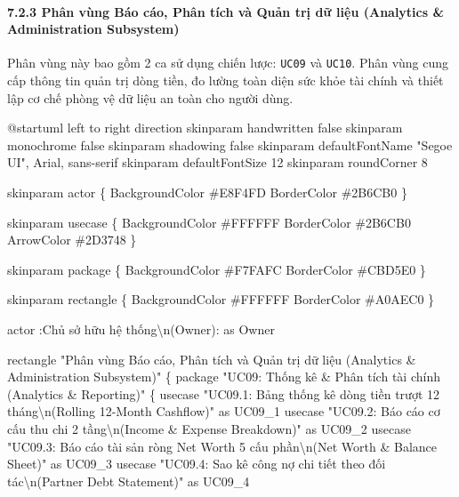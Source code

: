 \documentclass[11pt,a4paper]{article}
\newenvironment{Shaded}{}{}
\newcommand{\NormalTok}[1]{#1}
\begin{document}
\paragraph{7.2.3 Phân vùng Báo cáo, Phân tích và Quản trị dữ liệu
(Analytics \& Administration
Subsystem)}\label{723-phuxe2n-vuxf9ng-buxe1o-cuxe1o-phuxe2n-tuxedch-vuxe0-quux1ea3n-trux1ecb-dux1eef-liux1ec7u-analytics--administration-subsystem}

Phân vùng này bao gồm 2 ca sử dụng chiến lược: \texttt{UC09} và
\texttt{UC10}. Phân vùng cung cấp thông tin quản trị dòng tiền, đo lường
toàn diện sức khỏe tài chính và thiết lập cơ chế phòng vệ dữ liệu an
toàn cho người dùng.

\iffalse
\begin{Shaded}
\begin{Highlighting}[]
\NormalTok{@startuml}
\NormalTok{left to right direction}
\NormalTok{skinparam handwritten false}
\NormalTok{skinparam monochrome false}
\NormalTok{skinparam shadowing false}
\NormalTok{skinparam defaultFontName "Segoe UI", Arial, sans{-}serif}
\NormalTok{skinparam defaultFontSize 12}
\NormalTok{skinparam roundCorner 8}

\NormalTok{skinparam actor \{}
\NormalTok{    BackgroundColor \#E8F4FD}
\NormalTok{    BorderColor \#2B6CB0}
\NormalTok{\}}

\NormalTok{skinparam usecase \{}
\NormalTok{    BackgroundColor \#FFFFFF}
\NormalTok{    BorderColor \#2B6CB0}
\NormalTok{    ArrowColor \#2D3748}
\NormalTok{\}}

\NormalTok{skinparam package \{}
\NormalTok{    BackgroundColor \#F7FAFC}
\NormalTok{    BorderColor \#CBD5E0}
\NormalTok{\}}

\NormalTok{skinparam rectangle \{}
\NormalTok{    BackgroundColor \#FFFFFF}
\NormalTok{    BorderColor \#A0AEC0}
\NormalTok{\}}

\NormalTok{actor :Chủ sở hữu hệ thống\textbackslash{}n(Owner): as Owner}

\NormalTok{rectangle "Phân vùng Báo cáo, Phân tích và Quản trị dữ liệu (Analytics \& Administration Subsystem)" \{}
\NormalTok{    package "UC09: Thống kê \& Phân tích tài chính (Analytics \& Reporting)" \{}
\NormalTok{        usecase "UC09.1: Bảng thống kê dòng tiền trượt 12 tháng\textbackslash{}n(Rolling 12{-}Month Cashflow)" as UC09\_1}
\NormalTok{        usecase "UC09.2: Báo cáo cơ cấu thu chi 2 tầng\textbackslash{}n(Income \& Expense Breakdown)" as UC09\_2}
\NormalTok{        usecase "UC09.3: Báo cáo tài sản ròng Net Worth 5 cấu phần\textbackslash{}n(Net Worth \& Balance Sheet)" as UC09\_3}
\NormalTok{        usecase "UC09.4: Sao kê công nợ chi tiết theo đối tác\textbackslash{}n(Partner Debt Statement)" as UC09\_4}
        

\end{Highlighting}
\end{Shaded}
\end{document}
